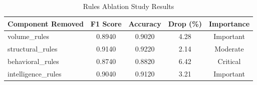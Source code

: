 \begin{table}[htbp]
\centering
\caption{Rules Ablation Study Results}
\label{tab:ablation_rules}
\begin{tabular}{lcccc}
\toprule
Component Removed & F1 Score & Accuracy & Drop (\%) & Importance \\
\midrule
volume_rules & 0.8940 & 0.9020 & 4.28 & Important \\
structural_rules & 0.9140 & 0.9220 & 2.14 & Moderate \\
behavioral_rules & 0.8740 & 0.8820 & 6.42 & Critical \\
intelligence_rules & 0.9040 & 0.9120 & 3.21 & Important \\
\bottomrule
\end{tabular}
\end{table}